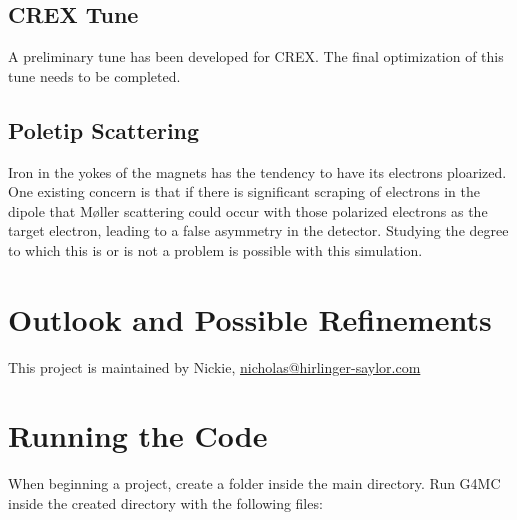 \documentclass[11pt]{amsart}
\begin{document}
\subsection{ CREX Tune }

A preliminary tune has been developed for CREX. The final optimization of this tune needs to be completed.

\subsection{ Poletip Scattering}

Iron in the yokes of the magnets has the tendency to have its electrons ploarized. One existing concern is that if there is significant scraping of electrons in the dipole that M\o ller scattering could occur with those polarized electrons as the target electron, leading to a false asymmetry in the detector. Studying the degree to which this is or is not a problem is possible with this simulation. 

\newpage
\section{Outlook and Possible Refinements}

This project is maintained by Nickie, \href{mailto:nicholas@hirlinger-saylor.com}{nicholas@hirlinger-saylor.com}

\section{Running the Code}

When beginning a project, create a folder inside the main directory. Run G4MC inside the created directory with the following files:
\end{document}
